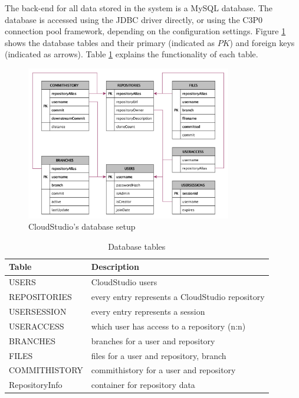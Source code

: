 The back-end for all data stored in the system is a MySQL database. The database is accessed using the JDBC driver directly, or using the C3P0 connection pool framework, depending on the configuration settings. Figure \ref{fig:databasegraph} shows the database tables and their primary (indicated as $PK$) and foreign keys (indicated as arrows). Table \ref{table:databasetables} explains the functionality of each table.


\begin{figure}[h!]
  \centering
      \includegraphics[width=0.8\textwidth]{databasegraph}
  \caption{CloudStudio's database setup}
  \label{fig:databasegraph}
\end{figure}



\begin{table}

    \scriptsize
    \begin{tabularx}{\textwidth}{ | l | X | }
    \hline
\textbf{Table} & \textbf{Description} \\ \hline
USERS & CloudStudio users \\ \hline
REPOSITORIES & every entry represents a CloudStudio repository \\ \hline
USERSESSION & every entry represents a session \\ \hline
USERACCESS & which user has access to a repository (n:n) \\ \hline
BRANCHES & branches for a user and repository \\ \hline
FILES & files for a user and repository, branch \\ \hline
COMMITHISTORY & commithistory for a user and repository \\ \hline
RepositoryInfo & container for repository data \\ \hline
    \end{tabularx}
    
    \centering
  \caption{Database tables}
  \label{table:databasetables}
\end{table}



